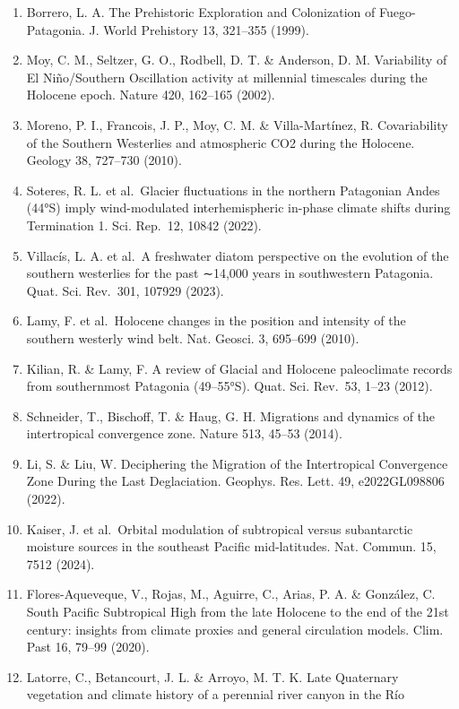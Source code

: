 \documentclass[
]{article}
\begin{document}
\begin{enumerate}
\item
  Borrero, L. A. The Prehistoric Exploration and Colonization of
  Fuego-Patagonia. J. World Prehistory 13, 321--355 (1999).
\item
  Moy, C. M., Seltzer, G. O., Rodbell, D. T. \& Anderson, D. M.
  Variability of El Niño/Southern Oscillation activity at millennial
  timescales during the Holocene epoch. Nature 420, 162--165 (2002).
\item
  Moreno, P. I., Francois, J. P., Moy, C. M. \& Villa-Martínez, R.
  Covariability of the Southern Westerlies and atmospheric CO2 during
  the Holocene. Geology 38, 727--730 (2010).
\item
  Soteres, R. L. et al.~Glacier fluctuations in the northern Patagonian
  Andes (44°S) imply wind-modulated interhemispheric in-phase climate
  shifts during Termination 1. Sci. Rep.~12, 10842 (2022).
\item
  Villacís, L. A. et al.~A freshwater diatom perspective on the
  evolution of the southern westerlies for the past ∼14,000 years in
  southwestern Patagonia. Quat. Sci. Rev.~301, 107929 (2023).
\item
  Lamy, F. et al.~Holocene changes in the position and intensity of the
  southern westerly wind belt. Nat. Geosci. 3, 695--699 (2010).
\item
  Kilian, R. \& Lamy, F. A review of Glacial and Holocene paleoclimate
  records from southernmost Patagonia (49--55°S). Quat. Sci. Rev.~53,
  1--23 (2012).
\item
  Schneider, T., Bischoff, T. \& Haug, G. H. Migrations and dynamics of
  the intertropical convergence zone. Nature 513, 45--53 (2014).
\item
  Li, S. \& Liu, W. Deciphering the Migration of the Intertropical
  Convergence Zone During the Last Deglaciation. Geophys. Res. Lett. 49,
  e2022GL098806 (2022).
\item
  Kaiser, J. et al.~Orbital modulation of subtropical versus
  subantarctic moisture sources in the southeast Pacific mid-latitudes.
  Nat. Commun. 15, 7512 (2024).
\item
  Flores-Aqueveque, V., Rojas, M., Aguirre, C., Arias, P. A. \&
  González, C. South Pacific Subtropical High from the late Holocene to
  the end of the 21st century: insights from climate proxies and general
  circulation models. Clim. Past 16, 79--99 (2020).
\item
  Latorre, C., Betancourt, J. L. \& Arroyo, M. T. K. Late Quaternary
  vegetation and climate history of a perennial river canyon in the Río

\end{enumerate}
\end{document}
